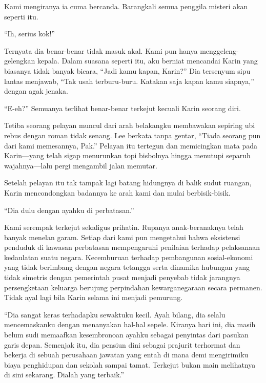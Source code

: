 \documentclass[smalldemyvopaper,11pt,twoside,onecolumn,openright,extrafontsizes]{memoir}
\begin{document}
Kami mengiranya ia cuma bercanda. Barangkali semua penggila misteri akan seperti itu.

``Ih, serius kok!''


Ternyata dia benar-benar tidak masuk akal. Kami pun hanya menggeleng-gelengkan kepala. Dalam suasana seperti itu, aku berniat mencandai Karin yang biasanya tidak banyak bicara, ``Jadi kamu kapan, Karin?'' Dia tersenyum sipu lantas menjawab, ``Tak usah terburu-buru. Katakan saja kapan kamu siapnya,'' dengan agak jenaka.

``E-eh?'' Semuanya terlihat benar-benar terkejut kecuali Karin seorang diri.


Tetiba seorang pelayan muncul dari arah belakangku membawakan sepiring ubi rebus dengan roman tidak senang. Lee berkata tanpa gentar, ``Tiada seorang pun dari kami memesannya, Pak.'' Pelayan itu tertegun dan memicingkan mata pada Karin---yang telah sigap menurunkan topi bisbolnya hingga menutupi separuh wajahnya---lalu pergi mengambil jalan memutar.

Setelah pelayan itu tak tampak lagi batang hidungnya di balik sudut ruangan, Karin mencondongkan badannya ke arah kami dan mulai berbisik-bisik.

``Dia dulu dengan ayahku di perbatasan.''


Kami serempak terkejut sekaligus prihatin. Rupanya anak-beranaknya telah banyak menelan garam. Setiap dari kami pun mengetahui bahwa eksistensi penduduk di kawasan perbatasan mempengaruhi penilaian terhadap pelaksanaan kedaulatan suatu negara. Kecemburuan terhadap pembangunan sosial-ekonomi yang tidak berimbang dengan negara tetangga serta dinamika hubungan yang tidak simetris dengan pemerintah pusat menjadi penyebab tidak jarangnya persengketaan keluarga berujung perpindahan kewarganegaraan secara permanen. Tidak ayal lagi bila Karin selama ini menjadi pemurung.

``Dia sangat keras terhadapku sewaktuku kecil. Ayah bilang, dia selalu mencemaskanku dengan menanyakan hal-hal sepele. Kiranya hari ini, dia masih belum sudi memaafkan kesembronoan ayahku sebagai penyintas dari pasukan garis depan. Semenjak itu, dia pensiun dini sebagai prajurit terhormat dan bekerja di sebuah perusahaan jawatan yang entah di mana demi mengirimiku biaya penghidupan dan sekolah sampai tamat. Terkejut bukan main melihatnya di sini sekarang. Dialah yang terbaik.''
\end{document}
